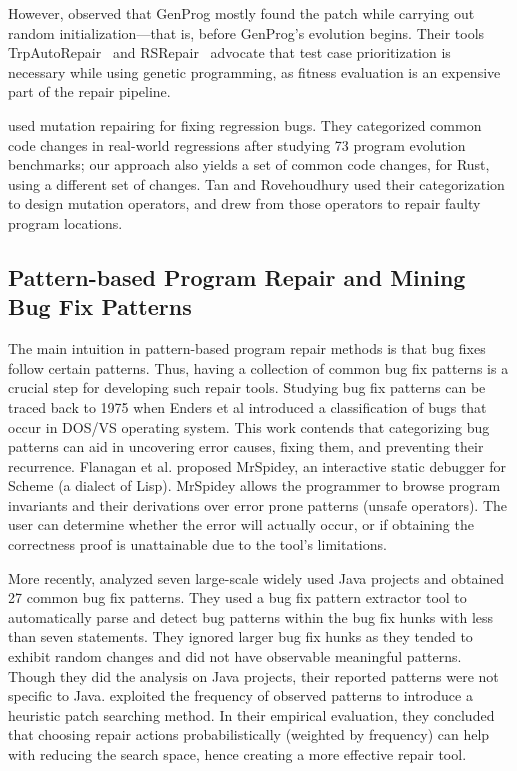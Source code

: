 However, \cite{arcuri2011practical} observed that GenProg mostly found the patch while carrying out random initialization---that is, before GenProg's evolution begins. Their tools TrpAutoRepair~\citep{qi2013efficient} and RSRepair~\citep{qi2014strength} advocate that test case prioritization is necessary while using genetic programming, as fitness evaluation is an expensive part of the repair pipeline.

\cite{tan2015relifix} used mutation repairing for fixing regression bugs. They categorized common code changes in real-world regressions after studying 73 program evolution benchmarks; our approach also yields a set of common code changes, for Rust, using a different set of changes. Tan and Rovehoudhury used their categorization to design mutation operators, and drew from those operators to repair faulty program locations.

\subsection{Pattern-based Program Repair and Mining Bug Fix Patterns}

The main intuition in pattern-based program repair methods is that bug fixes follow certain patterns. Thus, having a collection of common bug fix patterns is a crucial step for developing such repair tools. Studying bug fix patterns can be traced back to 1975 when Enders et al introduced a classification of bugs that occur in DOS/VS operating system. This work contends that categorizing bug patterns can aid in uncovering error causes, fixing them, and preventing their recurrence. Flanagan et al. proposed MrSpidey, an interactive static debugger for Scheme (a dialect of Lisp). MrSpidey allows the programmer to browse program invariants and their derivations over error prone patterns (unsafe operators). The user can determine whether the error will actually occur, or if obtaining the correctness proof is unattainable due to the tool's limitations.

More recently, \cite{pan2009toward} analyzed seven large-scale widely used Java projects and obtained 27 common bug fix patterns. They used a bug fix pattern extractor tool to automatically parse and detect bug patterns within the bug fix hunks with less than seven statements. They ignored larger bug fix hunks as they tended to exhibit random changes and did not have observable meaningful patterns. Though they did the analysis on Java projects, their reported patterns were not specific to Java. \cite{martinez2015mining,martinez2012mining} exploited the frequency of observed patterns to introduce a heuristic patch searching method. In their empirical evaluation, they concluded that choosing repair actions probabilistically (weighted by frequency) can help with reducing the search space, hence creating a more effective repair tool.

